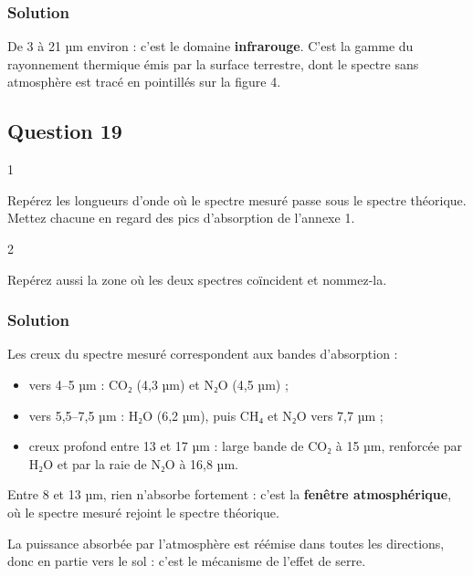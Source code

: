 \documentclass[11pt,a4paper]{article}
\providecommand{\tightlist}{\setlength{\itemsep}{0pt}\setlength{\parskip}{0pt}}
\begin{document}
\hypertarget{solution-17}{%
\subsubsection{Solution}\label{solution-17}}

De 3 à 21 µm environ : c'est le domaine \textbf{infrarouge}. C'est la gamme du rayonnement thermique émis par la surface terrestre, dont le spectre sans atmosphère est tracé en pointillés sur la figure 4.

\hypertarget{question-19}{%
\subsection{Question 19}\label{question-19}}

\begin{indication}{1}

Repérez les longueurs d'onde où le spectre mesuré passe sous le spectre théorique. Mettez chacune en regard des pics d'absorption de l'annexe 1.

\end{indication}

\begin{indication}{2}

Repérez aussi la zone où les deux spectres coïncident et nommez-la.

\end{indication}

\hypertarget{solution-18}{%
\subsubsection{Solution}\label{solution-18}}

Les creux du spectre mesuré correspondent aux bandes d'absorption :

\begin{itemize}
\tightlist
\item
  vers 4--5 µm : CO₂ (4,3 µm) et N₂O (4,5 µm) ;
\item
  vers 5,5--7,5 µm : H₂O (6,2 µm), puis CH₄ et N₂O vers 7,7 µm ;
\item
  creux profond entre 13 et 17 µm : large bande de CO₂ à 15 µm, renforcée par H₂O et par la raie de N₂O à 16,8 µm.
\end{itemize}

Entre 8 et 13 µm, rien n'absorbe fortement : c'est la \textbf{fenêtre atmosphérique}, où le spectre mesuré rejoint le spectre théorique.

La puissance absorbée par l'atmosphère est réémise dans toutes les directions, donc en partie vers le sol : c'est le mécanisme de l'effet de serre.
\end{document}
